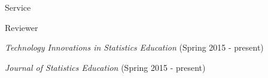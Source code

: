 \documentclass{resume} %
\begin{document}

\begin{rSection}{Service}
	
	
	\begin{rSubsection}{Reviewer}{}{}{}
		\item[] \textit{Technology Innovations in Statistics Education} (Spring 2015 - present)
		\item[] \textit{Journal of Statistics Education} (Spring 2015 - present)

	\end{rSubsection}
	
	
\end{rSection}


\end{document}
